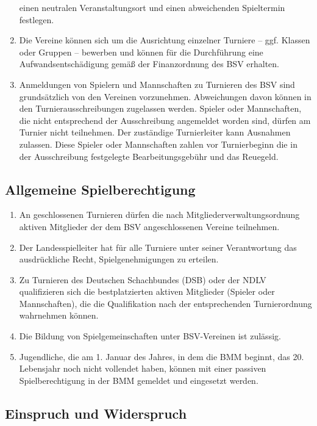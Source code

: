 \documentclass[fontsize=12pt, paper=a4, ngerman]{article}
\begin{document}
\begin{enumerate}
einen neutralen Veranstaltungsort und einen abweichenden Spieltermin festlegen.
\item Die Vereine können sich um die Ausrichtung einzelner Turniere -- ggf. Klassen oder Gruppen -- bewerben und können für die Durchführung eine
Aufwandsentschädigung gemäß der Finanzordnung des BSV erhalten.
\item Anmeldungen von Spielern und Mannschaften zu Turnieren des BSV sind grundsätzlich von den Vereinen vorzunehmen. Abweichungen davon können
in den Turnierausschreibungen zugelassen werden. Spieler oder Mannschaften, die nicht entsprechend der Ausschreibung angemeldet worden sind,
dürfen am Turnier nicht teilnehmen. Der zuständige Turnierleiter kann Ausnahmen zulassen. Diese Spieler oder Mannschaften zahlen vor Turnierbeginn die in der
Ausschreibung festgelegte Bearbeitungsgebühr und das Reuegeld.

\end{enumerate}

\subsection{Allgemeine Spielberechtigung}

\begin{enumerate}
\item An geschlossenen Turnieren dürfen die nach Mitgliederverwaltungsordnung aktiven Mitglieder der dem BSV angeschlossenen Vereine teilnehmen.
\item Der Landesspielleiter hat für alle Turniere unter seiner Verantwortung das ausdrückliche Recht, Spielgenehmigungen zu erteilen.
\item Zu Turnieren des Deutschen Schachbundes (DSB) oder der NDLV qualifizieren sich die bestplatzierten aktiven Mitglieder (Spieler oder Mannschaften),
die die Qualifikation nach der entsprechenden Turnierordnung wahrnehmen können.
\item Die Bildung von Spielgemeinschaften unter BSV-Vereinen ist zulässig.
\item Jugendliche, die am 1. Januar des Jahres, in dem die BMM beginnt, das 20. Lebensjahr noch nicht vollendet haben,
können mit einer passiven Spielberechtigung in der BMM gemeldet und eingesetzt werden.
\end{enumerate}

\subsection{Einspruch und Widerspruch}
\end{document}
